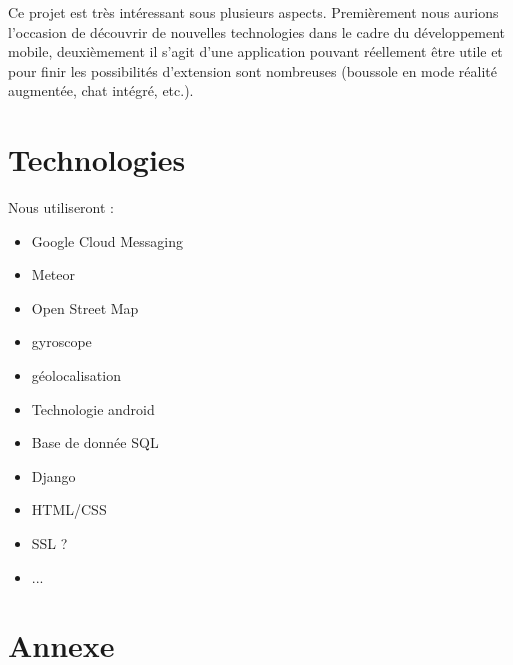 \documentclass[french]{article}
\begin{document}
		Ce projet est très intéressant sous plusieurs aspects. Premièrement nous aurions l'occasion de découvrir de nouvelles technologies dans le cadre du développement mobile, deuxièmement il s'agit d'une application pouvant réellement être utile et pour finir les possibilités d'extension sont nombreuses (boussole en mode réalité augmentée, chat intégré, etc.).
		
	\section{Technologies}
		Nous utiliseront :
		\begin{itemize}
			\item Google Cloud Messaging
			\item Meteor
			\item Open Street Map
			\item gyroscope
			\item géolocalisation
			\item Technologie android
			\item Base de donnée SQL
			\item Django
			\item HTML/CSS
			\item SSL ?
			\item ...
		\end{itemize}
		
	\section{Annexe}
		
	
\end{document}
